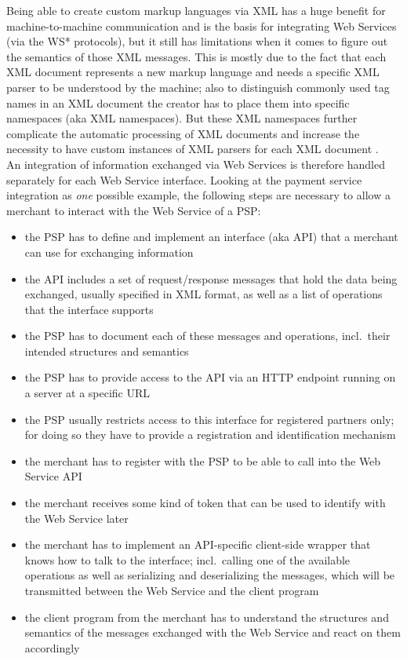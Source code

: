 Being able to create custom markup languages via \gls{XML} has a huge benefit for machine-to-machine communication and is the basis for integrating Web Services (via the WS* protocols), but it still has limitations when it comes to figure out the semantics of those \gls{XML} messages. This is mostly due to the fact that each \gls{XML} document represents a new markup language and needs a specific \gls{XML} parser to be understood by the machine; also to distinguish commonly used tag names in an \gls{XML} document the creator has to place them into specific namespaces (aka \gls{XML} namespaces). But these \gls{XML} namespaces further complicate the automatic processing of \gls{XML} documents and increase the necessity to have custom instances of \gls{XML} parsers for each \gls{XML} document \citep{taylor2008p2p}. \\

An integration of information exchanged via Web Services is therefore handled separately for each Web Service interface. Looking at the payment service integration as \emph{one} possible example, the following steps are necessary to allow a merchant to interact with the Web Service of a \gls{PSP}: \@

\begin{itemize}
  \item the \gls{PSP} has to define and implement an interface (aka \gls{API}) that a merchant can use for exchanging information
  \item the \gls{API} includes a set of request/response messages that hold the data being exchanged, usually specified in \gls{XML} format, as well as a list of operations that the interface supports
  \item the \gls{PSP} has to document each of these messages and operations, incl.\ their intended structures and semantics
  \item the \gls{PSP} has to provide access to the \gls{API} via an \gls{HTTP} endpoint running on a server at a specific \gls{URL}
  \item the \gls{PSP} usually restricts access to this interface for registered partners only; for doing so they have to provide a registration and identification mechanism
  \item the merchant has to register with the \gls{PSP} to be able to call into the Web Service \gls{API}
  \item the merchant receives some kind of token that can be used to identify with the Web Service later
  \item the merchant has to implement an \gls{API}-specific client-side wrapper that knows how to talk to the interface; incl.\ calling one of the available operations as well as serializing and deserializing the messages, which will be transmitted between the Web Service and the client program
  \item the client program from the merchant has to understand the structures and semantics of the messages exchanged with the Web Service and react on them accordingly
\end{itemize}

